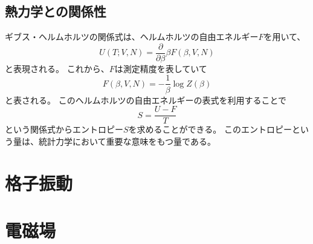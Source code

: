 \documentclass[a4paper]{jsreport}
\begin{document}
        \section{熱力学との関係性}
            ギブス・ヘルムホルツの関係式は、ヘルムホルツの自由エネルギー$F$を用いて、
            \begin{equation}
                U(T; V, N) = \frac{\partial}{\partial\beta}{\beta F(\beta, V, N)}
            \end{equation}
            と表現される。
            これから、$F$は測定精度を表していて
            \begin{equation}
                F(\beta, V, N) = - \frac{1}{\beta} \log{Z(\beta)}
            \end{equation}
            と表される。
            このヘルムホルツの自由エネルギーの表式を利用することで
            \begin{equation}
                S = \frac{U - F}{T}
            \end{equation}
            という関係式からエントロピー$S$を求めることができる。
            このエントロピーという量は、統計力学において重要な意味をもつ量である。

    \chapter{格子振動}


    \chapter{電磁場}
        
\end{document}
